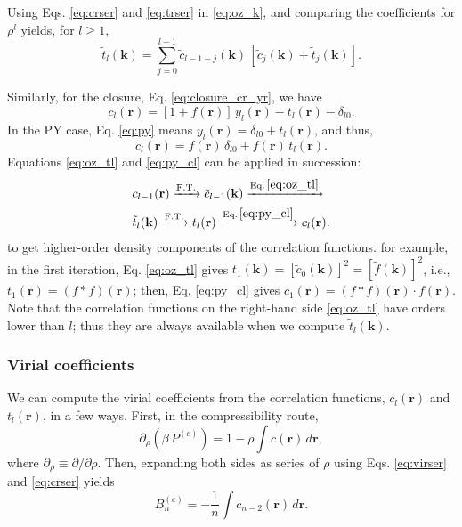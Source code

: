 \documentclass[aip,jcp,preprint,superscriptaddress,showpacs,preprintnumbers,amsmath,amssymb]{revtex4-1}
\newcommand{\vct}[1]{\mathbf{#1}}
\providecommand{\vr}{} %
\renewcommand{\vr}{\vct{r}}
\newcommand{\vk}{\vct{k}}
\begin{document}
Using Eqs. \eqref{eq:crser} and \eqref{eq:trser}
in \eqref{eq:oz_k},
and comparing the coefficients for $\rho^l$ yields,
for $l \ge 1$,
\begin{equation}
\tilde t_l(\vk)
=
\sum_{j = 0}^{l - 1}
\tilde c_{l - 1 -j}(\vk)
\,
[\tilde c_j(\vk) + \tilde t_j(\vk)].
\label{eq:oz_tl}
\end{equation}



Similarly, for the closure, Eq. \eqref{eq:closure_cr_yr},
we have
\begin{equation}
c_l(\vr)
=
[1 + f(\vr)] \, y_l(\vr)
- t_l(\vr) - \delta_{l0}.
\label{eq:closure_cl_yl}
\end{equation}
%
In the PY case,
Eq. \eqref{eq:py}
means $y_l(\vr) = \delta_{l0} + t_l(\vr)$,
and thus,
\begin{equation}
c_l(\vr)
= f(\vr) \, \delta_{l0} + f(\vr) \, t_l(\vr).
\label{eq:py_cl}
\end{equation}
%
Equations \eqref{eq:oz_tl} and \eqref{eq:py_cl}
can be applied in succession:
%
%
%
\begin{align*}
&
c_{l-1}(\vr)
\xrightarrow{ \mathrm{F.T.} }
\tilde c_{l-1}(\vk)
\xrightarrow{ \mathrm{Eq.\,\eqref{eq:oz_tl}} }
\\
&
\tilde t_l(\vk)
\xrightarrow{ \mathrm{F.T.} }
t_l(\vr)
\xrightarrow{ \mathrm{Eq.\,\eqref{eq:py_cl}} }
c_l(\vr).
\end{align*}
%
%
%
to get higher-order density components of the correlation functions.
%
for example,
in the first iteration,
Eq. \eqref{eq:oz_tl} gives
$\tilde t_1(\vk) = [\tilde c_0(\vk)]^2 = [\tilde f(\vk)]^2$,
i.e.,
$t_1(\vr) = (f*f)(\vr)$;
then, Eq. \eqref{eq:py_cl} gives
$c_1(\vr) = (f*f)(\vr) \cdot f(\vr)$.
%
Note that the correlation functions
on the right-hand side \eqref{eq:oz_tl}
have orders lower than $l$;
%
thus they are always available
when we compute $\tilde t_l(\vk)$.





\subsubsection{Virial coefficients}





We can compute the virial coefficients
from the correlation functions, $c_l(\vr)$ and $t_l(\vr)$,
in a few ways.
%
First, in the compressibility route,
%
\begin{equation}
\partial_\rho( \beta \, P^{(c)} )
=
1 - \rho \int c(\vr) \, d\vr,
\label{eq:P_compressibility}
\end{equation}
%
where $\partial_\rho \equiv \partial/\partial \rho$.
%
Then, expanding both sides as series of $\rho$
using Eqs. \eqref{eq:virser} and \eqref{eq:crser} yields
%
\begin{equation}
B_n^{(c)}
=
-\frac{1}{n}
\int c_{n-2}(\vr) \, d\vr.
\label{eq:Bn_compressibility}
\end{equation}
\end{document}
